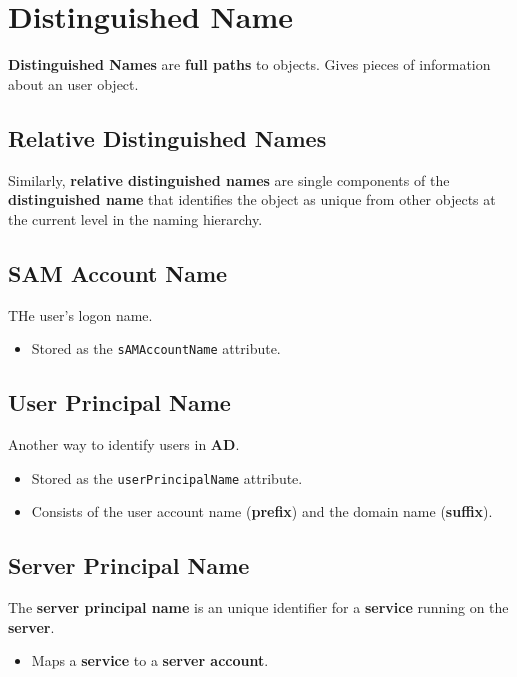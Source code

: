 \documentclass[12pt, letterpaper]{article}
\begin{document}
\section*{Distinguished Name}

\textbf{Distinguished Names} are \textbf{full paths} to objects. Gives pieces of information about an user object. %

\subsection*{Relative Distinguished Names}

Similarly, \textbf{relative distinguished names} are single components of the \textbf{distinguished name} that identifies the object as unique from other objects at the current level in the naming hierarchy. %

\subsection*{SAM Account Name}

THe user's logon name.

\begin{itemize}
    \item Stored as the \texttt{sAMAccountName} attribute.
\end{itemize}

\subsection*{User Principal Name}

Another way to identify users in \textbf{AD}.

\begin{itemize}
    \item Stored as the \texttt{userPrincipalName} attribute.
    \item Consists of the user account name (\textbf{prefix}) and the domain name (\textbf{suffix}).
\end{itemize}

\subsection*{Server Principal Name}

The \textbf{server principal name} is an unique identifier for a \textbf{service} running on the \textbf{server}.

\begin{itemize}
    \item Maps a \textbf{service} to a \textbf{server account}. %
\end{itemize}
\end{document}
